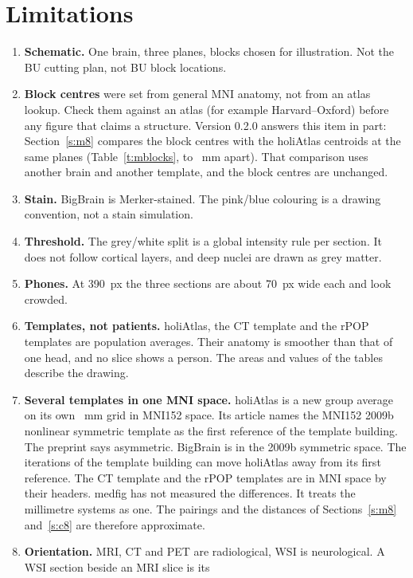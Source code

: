 \documentclass[10pt,a4paper]{article}
\begin{document}
\section{Limitations}\label{s:limits}
\begin{enumerate}
\item \textbf{Schematic.} One brain, three planes, blocks chosen for illustration. Not the BU cutting plan, not BU block locations.
\item\label{l:blocks} \textbf{Block centres} were set from general MNI anatomy, not from an atlas lookup. Check them against an atlas
(for example Harvard--Oxford) before any figure that claims a structure. Version 0.2.0 answers this item in part:
Section~\ref{s:m8} compares the block centres with the holiAtlas centroids at the same planes (Table~\ref{t:mblocks},
\mDistMin{} to \mDistMax~mm apart). That comparison uses another brain and another template, and the block centres are
unchanged.
\item \textbf{Stain.} BigBrain is Merker-stained. The pink/blue colouring is a drawing convention, not a stain simulation.
\item \textbf{Threshold.} The grey/white split is a global intensity rule per section. It does not follow cortical layers, and
deep nuclei are drawn as grey matter.
\item \textbf{Phones.} At 390~px the three sections are about 70~px wide each and look crowded.
\item \textbf{Templates, not patients.} holiAtlas, the CT template and the rPOP templates are population averages. Their
anatomy is smoother than that of one head, and no slice shows a person. The areas and values of the tables describe the
drawing.
\item\label{l:spaces} \textbf{Several templates in one MNI space.} holiAtlas is a new group average on its own \mVoxel~mm grid in
MNI152 space. Its article \cite{manjon2026} names the MNI152 2009b nonlinear symmetric template as the first reference of the
template building. The preprint says asymmetric. BigBrain is in the 2009b symmetric space. The iterations of the template
building can move holiAtlas away from its first reference. The CT template and the rPOP templates are in MNI space by their
headers. medfig has not measured the differences. It treats the millimetre systems as one. The pairings and the distances of
Sections~\ref{s:m8} and~\ref{s:c8} are therefore approximate.
\item \textbf{Orientation.} MRI, CT and PET are radiological, WSI is neurological. A WSI section beside an MRI slice is its

\end{enumerate}
\end{document}
